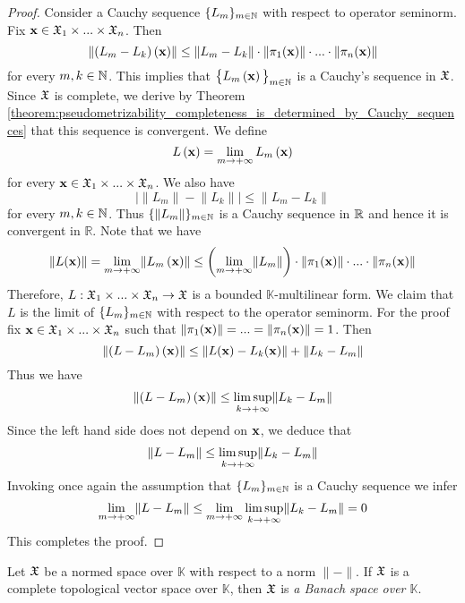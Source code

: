 \begin{proof}
   Consider a Cauchy sequence $\{L_m\}_{m\in {\mathbb N}}$ with respect to operator seminorm. Fix $\mathbf{x} \in {\mathfrak X}_1\times ... \times {\mathfrak X}_n$. Then 
   $$\lVert \left(L_m - L_k\right)\left(\mathbf{x}\right)\rVert \leq \lVert L_m-L_k \rVert\cdot \lVert \pi_1(\mathbf{x})\rVert\cdot ...\cdot \lVert \pi_n(\mathbf{x})\rVert$$
   for every $m,k\in {\mathbb N}$. This implies that $\big\{L_m\left(\mathbf{x}\right)\big\}_{m\in {\mathbb N}}$ is a Cauchy's sequence in ${\mathfrak X}$. Since ${\mathfrak X}$ is complete, we derive by Theorem \ref{theorem:pseudometrizability_completeness_is_determined_by_Cauchy_sequences} that this sequence is convergent. We define
   $$L\left(\mathbf{x}\right) = \lim_{m\rightarrow +\infty}L_m\left(\mathbf{x}\right)$$
   for every $\mathbf{x} \in {\mathfrak X}_1\times ...\times {\mathfrak X}_n$. We also have
   $$\big|\lVert L_m\rVert - \lVert L_k\rVert\big| \leq \lVert L_m - L_k\rVert$$
   for every $m,k \in {\mathbb N}$. Thus $\{\lVert L_m \rVert\}_{m\in {\mathbb N}}$ is a Cauchy sequence in ${\mathbb R}$ and hence it is convergent in $\mathbb{R}$.  Note that we have
   $$\lVert L(\mathbf{x})\rVert = \lim_{m\rightarrow +\infty}\lVert L_m\left(\mathbf{x}\right)\rVert \leq \left(\lim_{m\rightarrow +\infty}\lVert L_m \rVert\right) \cdot \lVert \pi_1(\mathbf{x})\rVert \cdot ...\cdot \lVert \pi_n(\mathbf{x})\rVert$$
   Therefore, $L:{\mathfrak X}_1\times ... \times {\mathfrak X}_n\rightarrow {\mathfrak X}$ is a bounded $\mathbb{K}$-multilinear form. We claim that $L$ is the limit of $\{L_m\}_{m\in {\mathbb N}}$ with respect to the operator seminorm. For the proof fix $\mathbf{x} \in {\mathfrak X}_1\times ... \times {\mathfrak X}_n$ such that $\lVert \pi_1(\mathbf{x})\rVert=...= \lVert\pi_n(\mathbf{x})\rVert = 1$. Then
   $$\lVert \left(L - L_m\right)(\mathbf{x})\rVert \leq \lVert L(\mathbf{x}) - L_k(\mathbf{x})\rVert + \lVert L_k - L_m \rVert$$
   Thus we have
   $$\lVert \left(L - L_m\right)(\mathbf{x}) \rVert \leq \limsup_{k\rightarrow +\infty}\lVert L_k - L_m \rVert$$
   Since the left hand side does not depend on $\mathbf{x}$, we deduce that
   $$\lVert L - L_m\rVert \leq \limsup_{k\rightarrow +\infty}\lVert L_k - L_m\rVert$$
   Invoking once again the assumption that $\{L_m\}_{m\in {\mathbb N}}$ is a Cauchy sequence we infer
   $$\lim_{m\rightarrow +\infty}\lVert L - L_m \rVert \leq \lim_{m\rightarrow +\infty}\limsup_{k\rightarrow +\infty}\lVert L_k - L_m\rVert = 0$$
   This completes the proof.
   \end{proof}

\begin{definition}
   Let ${\mathfrak X}$ be a normed space over $\mathbb{K}$ with respect to a norm $\lVert - \rVert$. If ${\mathfrak X}$ is a complete topological vector space over $\mathbb{K}$, then ${\mathfrak X}$ is \textit{a Banach space over $\mathbb{K}$}.
\end{definition}

